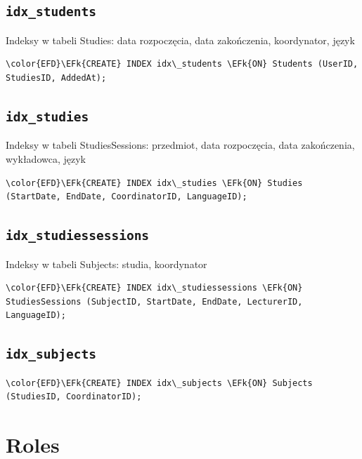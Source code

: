 \documentclass[11pt]{article}
\newcommand{\EFk}[1]{\textcolor{EFk}{\textbf{#1}}} %
\begin{document}
\subsection{\texttt{idx\_students}}
\label{sec:orgf080de1}
Indeksy w tabeli Studies: data rozpoczęcia, data zakończenia, koordynator, język
\begin{Code}
\begin{Verbatim}
\color{EFD}\EFk{CREATE} INDEX idx\_students \EFk{ON} Students (UserID, StudiesID, AddedAt);
\end{Verbatim}
\end{Code}
\subsection{\texttt{idx\_studies}}
\label{sec:orge6361b0}
Indeksy w tabeli StudiesSessions: przedmiot, data rozpoczęcia, data zakończenia, wykładowca, język
\begin{Code}
\begin{Verbatim}
\color{EFD}\EFk{CREATE} INDEX idx\_studies \EFk{ON} Studies (StartDate, EndDate, CoordinatorID, LanguageID);
\end{Verbatim}
\end{Code}
\subsection{\texttt{idx\_studiessessions}}
\label{sec:orge52ff70}
Indeksy w tabeli Subjects: studia, koordynator
\begin{Code}
\begin{Verbatim}
\color{EFD}\EFk{CREATE} INDEX idx\_studiessessions \EFk{ON} StudiesSessions (SubjectID, StartDate, EndDate, LecturerID, LanguageID);
\end{Verbatim}
\end{Code}
\subsection{\texttt{idx\_subjects}}
\label{sec:orgf9f0cf4}

\begin{Code}
\begin{Verbatim}
\color{EFD}\EFk{CREATE} INDEX idx\_subjects \EFk{ON} Subjects (StudiesID, CoordinatorID);
\end{Verbatim}
\end{Code}
\section{Roles}
\label{sec:orgfcbce81}
\end{document}
